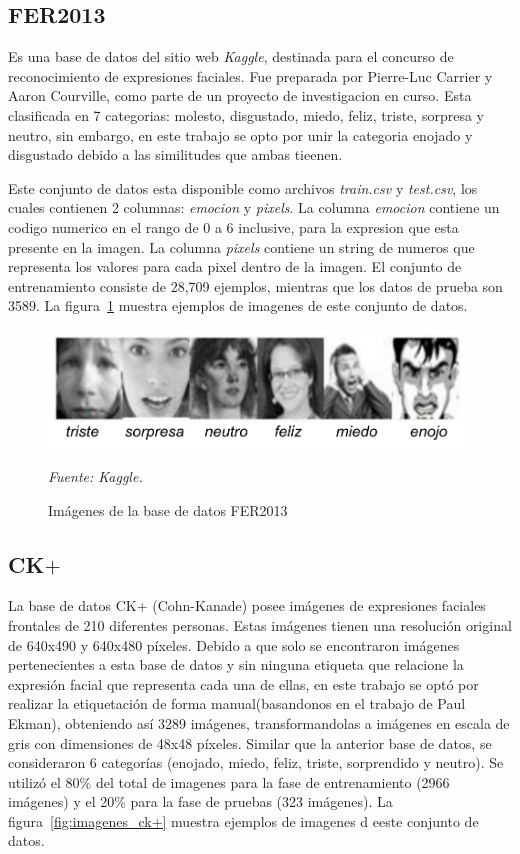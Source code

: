 \subsection{FER2013}
\label{subsec:fer2013}
Es una base de datos del sitio web \textit{Kaggle}, destinada para el concurso de reconocimiento de expresiones faciales. Fue preparada por Pierre-Luc Carrier y Aaron Courville, como parte de un proyecto de investigacion en curso. Esta clasificada en 7 categorias: molesto, disgustado, miedo, feliz, triste, sorpresa y neutro, sin embargo, en este trabajo se opto por unir la categoria enojado y disgustado debido a las similitudes que ambas tieenen.

Este conjunto de datos esta disponible como archivos \textit{train.csv} y \textit{test.csv}, los cuales contienen 2 columnas: \textit{emocion} y \textit{pixels}. La columna \textit{emocion} contiene un codigo numerico en el rango de 0 a 6 inclusive, para la expresion que esta presente en la imagen. La columna \textit{pixels} contiene un string de numeros que representa los valores para cada pixel dentro de la imagen. El conjunto de entrenamiento consiste de 28,709 ejemplos, mientras que los datos de prueba son 3589. La figura~\ref{fig:imagenes_fer} muestra ejemplos de imagenes de este conjunto de datos.


\begin{figure}[H]
		\centering
		\includegraphics[width=110mm]{Imagenes/imagenes_fer.pdf}
		\caption{Imágenes de la base de datos FER2013}
		\vspace{0.15cm}
		\textit{Fuente: Kaggle.}
		\label{fig:imagenes_fer}
\end{figure}

\subsection{CK$+$}
\label{subsec:ck+}
La base de datos CK+ (Cohn-Kanade) posee imágenes de expresiones faciales frontales de 210 diferentes personas. Estas imágenes tienen una resolución original de 640x490 y 640x480 píxeles. Debido a que solo se encontraron imágenes pertenecientes a esta base de datos y sin ninguna etiqueta que relacione la expresión facial que representa cada una de ellas, en este trabajo se optó por realizar la etiquetación de forma manual(basandonos en el trabajo de Paul Ekman), obteniendo así 3289 imágenes, transformandolas a imágenes en escala de gris con dimensiones de 48x48 píxeles. Similar que la anterior base de datos, se consideraron 6 categorías (enojado, miedo, feliz, triste, sorprendido y neutro). Se utilizó el 80\% del total de imagenes para la fase de entrenamiento (2966 imágenes) y el 20\% para la fase de pruebas (323 imágenes). La figura~\ref{fig:imagenes_ck+} muestra ejemplos de imagenes d eeste conjunto de datos.

